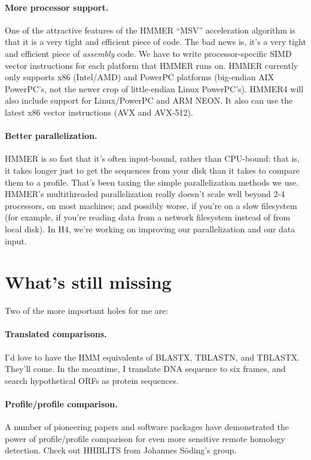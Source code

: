 \paragraph{More processor support.} One of the attractive features of the
HMMER ``MSV'' acceleration algorithm is that it is a very tight and
efficient piece of code. The bad news is, it's a very tight and
efficient piece of \emph{assembly} code. We have to write
processor-specific SIMD vector instructions for each platform that
HMMER runs on. HMMER currently only supports x86 (Intel/AMD) and
PowerPC platforms (big-endian AIX PowerPC's, not the newer crop of
little-endian Linux PowerPC's). HMMER4 will also include support for
Linux/PowerPC and ARM NEON. It also can use the latest x86 vector
instructions (AVX and AVX-512).

\paragraph{Better parallelization.} HMMER is so fast that it's often
input-bound, rather than CPU-bound: that is, it takes longer just to
get the sequences from your disk than it takes to compare them to a
profile. That's been taxing the simple parallelization methods we
use. HMMER's multithreaded parallelization really doesn't scale well
beyond 2-4 processors, on most machines; and possibly worse, if you're
on a slow filesystem (for example, if you're reading data from a
network filesystem instead of from local disk). In H4, we're working
on improving our parallelization and our data input.





\section{What's still missing}

Two of the more important holes for me are:

\paragraph{Translated comparisons.} I'd love to have the HMM
equivalents of BLASTX, TBLASTN, and TBLASTX. They'll come. In the
meantime, I translate DNA sequence to six frames, and search
hypothetical ORFs as protein sequences.

\paragraph{Profile/profile comparison.} A number of pioneering papers and
software packages have demonstrated the power of profile/profile
comparison for even more sensitive remote homology detection.  Check
out HHBLITS from Johannes S\"oding's
group.



